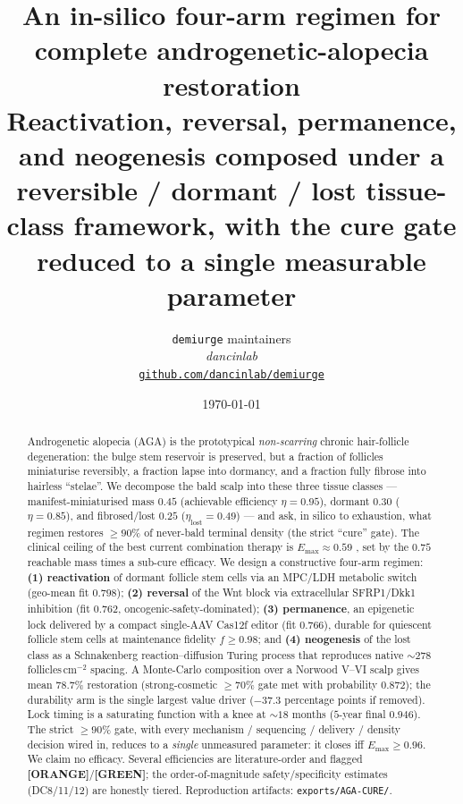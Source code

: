 \documentclass[11pt,a4paper]{article}
\title{
  \textbf{An in-silico four-arm regimen for complete androgenetic-alopecia
  restoration}\\[4pt]
  \large Reactivation, reversal, permanence, and neogenesis composed under a
  reversible / dormant / lost tissue-class framework, with the cure gate reduced
  to a single measurable parameter
}
\author{
  \texttt{demiurge} maintainers\\
  \normalsize\textit{dancinlab}\\[2pt]
  \normalsize\href{https://github.com/dancinlab/demiurge}{\texttt{github.com/dancinlab/demiurge}}
}
\date{\today}
\newcommand{\tierbadge}[2]{\textcolor{#1}{\textbf{[#2]}}}
\providecommand{\tierGreen}{\tierbadge{green!45!black}{GREEN}}
\providecommand{\tierOrange}{\tierbadge{orange!80!black}{ORANGE}}
\begin{document}
\maketitle

\begin{abstract}
Androgenetic alopecia (AGA) is the prototypical \emph{non-scarring} chronic
hair-follicle degeneration: the bulge stem reservoir is preserved, but a fraction
of follicles miniaturise reversibly, a fraction lapse into dormancy, and a fraction
fully fibrose into hairless ``stelae''. We decompose the bald scalp into these three
tissue classes --- manifest-miniaturised mass $0.45$ (achievable efficiency
$\eta\!=\!0.95$), dormant $0.30$ ($\eta\!=\!0.85$), and fibrosed/lost $0.25$
($\eta_{\text{lost}}\!=\!0.49$) --- and ask, in silico to exhaustion, what regimen
restores $\geq 90\%$ of never-bald terminal density (the strict ``cure'' gate). The
clinical ceiling of the best current combination therapy is $E_{\max}\!\approx\!0.59$
\citep{vanneste2020}, set by the $0.75$ reachable mass times a sub-cure efficacy.
We design a constructive four-arm regimen: \textbf{(1) reactivation} of dormant
follicle stem cells via an MPC/LDH metabolic switch (geo-mean fit $0.798$);
\textbf{(2) reversal} of the Wnt block via extracellular SFRP1/Dkk1 inhibition
(fit $0.762$, oncogenic-safety-dominated); \textbf{(3) permanence}, an epigenetic
lock delivered by a compact single-AAV Cas12f editor (fit $0.766$), durable for
quiescent follicle stem cells at maintenance fidelity $f\!\geq\!0.98$; and
\textbf{(4) neogenesis} of the lost class as a Schnakenberg reaction--diffusion
Turing process that reproduces native $\sim\!278$ follicles\,cm$^{-2}$ spacing.
A Monte-Carlo composition over a Norwood V--VI scalp gives mean $78.7\%$ restoration
(strong-cosmetic $\geq\!70\%$ gate met with probability $0.872$); the durability arm
is the single largest value driver ($-37.3$ percentage points if removed). Lock
timing is a saturating function with a knee at $\sim\!18$ months
($5$-year final $0.946$). The strict $\geq\!90\%$ gate, with every mechanism /
sequencing / delivery / density decision wired in, reduces to a \emph{single}
unmeasured parameter: it closes iff $E_{\max}\!\geq\!0.96$. We claim no efficacy.
Several efficiencies are literature-order and flagged \tierOrange/\tierGreen; the
order-of-magnitude safety/specificity estimates (DC8/11/12) are honestly tiered.
Reproduction artifacts: \texttt{exports/AGA-CURE/}.
\end{abstract}
\end{document}
